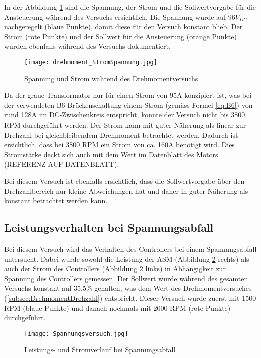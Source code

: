 In der Abbildung \ref{fig:drehmoment/StromSpannung} sind die Spannung, der Strom und die Sollwertvorgabe für die Ansteuerung während des Versuchs ersichtlich. Die Spannung wurde auf $96V_{DC}$ nachgeregelt (blaue Punkte), damit diese für den Versuch konstant blieb. Der Strom (rote Punkte) und der Sollwert für die Ansteuerung (orange Punkte) wurden ebenfalls während des Versuchs dokumentiert.


\begin{figure}[H]
	\centering
	\texttt{[image: drehmoment\_StromSpannung.jpg]}
	\caption{Spannung und Strom während des Drehmomentversuchs}\label{fig:drehmoment/StromSpannung}
\end{figure}

Da der graue Transformator nur für einen Strom von 95A konzipiert ist, was bei der verwendeten B6-Brückenschaltung einem Strom (gemäss Formel \ref{eq:B6}) von rund 128A im DC-Zwischenkreis entspricht, konnte der Versuch nicht bis 3800 RPM durchgeführt werden. Der Strom kann mit guter Näherung als linear zur Drehzahl bei gleichbleibendem Drehmoment betrachtet werden. Dadurch ist ersichtlich, dass bei 3800 RPM ein Strom von ca. 160A benötigt wird. Dies Stromstärke deckt sich auch mit dem Wert im Datenblatt des Motors (REFERENZ AUF DATENBLATT).

Bei diesem Versuch ist ebenfalls ersichtlich, dass die Sollwertvorgabe über den Drehzahlbereich nur kleine Abweichungen hat und daher in guter Näherung als konstant betrachtet werden kann.


\subsection{Leistungsverhalten bei Spannungsabfall}\label{subsec:LeistungSpannungabfall}
Bei diesem Versuch wird das Verhalten des Controllers bei einem Spannungsabfall untersucht. Dabei wurde sowohl die Leistung der ASM (Abbildung \ref{fig:Spannungsabfall} rechts) als auch der Strom des Controllers (Abbildung \ref{fig:Spannungsabfall} links) in Abhängigkeit zur Spannung des Controllers gemessen. Der Sollwert wurde während des gesamten Versuchs konstant auf 35.5\% gehalten, was dem Wert des Drehmomentversuches (\ref{subsec:DrehmomentDrehzahl}) entspricht. Dieser Versuch wurde zuerst mit 1500 RPM (blaue Punkte) und danach nochmals mit 2000 RPM (rote Punkte) durchgeführt.

\begin{figure}[H]
	\centering
	\texttt{[image: Spannungsversuch.jpg]}
	\caption{Leistungs- und Stromverlauf bei Spannungsabfall}\label{fig:Spannungsabfall}
\end{figure}

